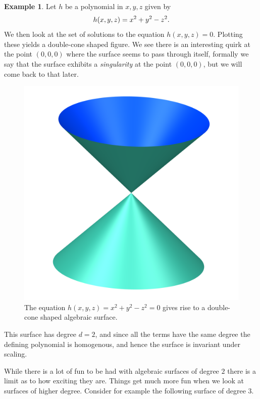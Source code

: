 \documentclass[a4paper]{article}
\theoremstyle{definition}
\newtheorem{exmpl}{Example}
\theoremstyle{plain}
\begin{document}
    \begin{exmpl}
        Let $h$ be a polynomial in $x, y, z$ given by
        \begin{equation}
            \notag h(x, y, z) = x^2 + y^2 - z^2. 
        \end{equation}
        We then look at the set of solutions to the equation $h(x, y, z) = 0$.
        Plotting these yields a double-cone shaped figure. We see there is an
        interesting quirk at the point $(0, 0, 0)$ where the surface seems to
        pass through itself, formally we say that the surface exhibits a
        \emph{singularity} at the point $(0, 0, 0)$, but we will come back to
        that later.
        \begin{figure}[h!]
            \centering
            \includegraphics[width=0.3\linewidth]{../pictures/double_cone.png}
            \caption{The equation $h(x, y, z) = x^2 + y^2 - z^2 = 0$ gives rise
            to a double-cone shaped algebraic surface.}
            \label{fig:../pictures/double_cone}
        \end{figure}
        This surface has degree $d = 2$, and since all the terms have the same
        degree the defining polynomial is homogenous, and hence the surface is
        invariant under scaling.  
    \end{exmpl} 
    
    While there is a lot of fun to be had with algebraic surfaces of degree $2$
    there is a limit as to how exciting they are. Things get much more fun when
    we look at surfaces of higher degree. Consider for example the following
    surface of degree $3$.
\end{document}
